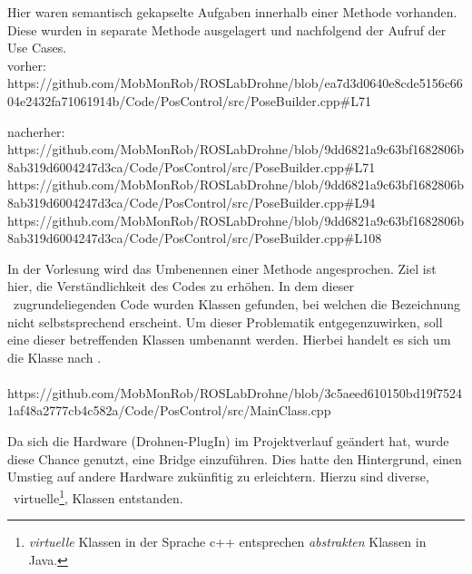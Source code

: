 Hier waren semantisch gekapselte Aufgaben innerhalb einer Methode vorhanden. Diese wurden in separate Methode ausgelagert und nachfolgend der Aufruf der Use Cases.\\
vorher:\\
https://github.com/MobMonRob/ROSLabDrohne/blob/ea7d3d0640e8cde5156c6604e2432fa71061914b/Code/PosControl/src/PoseBuilder.cpp\#L71

nacherher:\\
https://github.com/MobMonRob/ROSLabDrohne/blob/9dd6821a9c63bf1682806b8ab319d6004247d3ca/Code/PosControl/src/PoseBuilder.cpp\#L71
https://github.com/MobMonRob/ROSLabDrohne/blob/9dd6821a9c63bf1682806b8ab319d6004247d3ca/Code/PosControl/src/PoseBuilder.cpp\#L94
https://github.com/MobMonRob/ROSLabDrohne/blob/9dd6821a9c63bf1682806b8ab319d6004247d3ca/Code/PosControl/src/PoseBuilder.cpp\#L108


In der Vorlesung wird das Umbenennen einer Methode angesprochen. Ziel ist hier, die Verständlichkeit des Codes zu erhöhen.
In dem dieser \Arbeit\ zugrundeliegenden Code wurden Klassen gefunden, bei welchen die Bezeichnung nicht selbstsprechend erscheint. Um dieser Problematik entgegenzuwirken, soll eine dieser betreffenden Klassen umbenannt werden. Hierbei handelt es sich um die Klasse  nach  .\\
\\
https://github.com/MobMonRob/ROSLabDrohne/blob/3c5aeed610150bd19f75241af48a2777cb4c582a/Code/PosControl/src/MainClass.cpp




Da sich die Hardware (Drohnen-PlugIn) im Projektverlauf geändert hat, wurde diese Chance genutzt, eine Bridge einzuführen. Dies hatte den Hintergrund, einen Umstieg auf andere Hardware zukünfitig zu erleichtern.
Hierzu sind diverse, \tw\ virtuelle\footnote{\textit{virtuelle} Klassen in der Sprache c++ entsprechen \textit{abstrakten} Klassen in Java.}, Klassen entstanden.

























